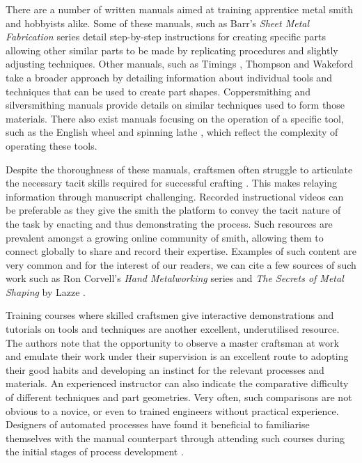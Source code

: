 There are a number of written manuals aimed at training apprentice metal smith and hobbyists alike. Some of these manuals, such as Barr's \emph{Sheet Metal Fabrication} series \citep{Barr2013ProfessionalFabrication,Barr2019SheetProjects} detail step-by-step instructions for creating specific parts allowing other similar parts to be made by replicating procedures and slightly adjusting techniques. Other manuals, such as Timings \citep{Timings2008SheetMetalwork}, Thompson \citep{Thompson2007ManufacturingProfessionals} and Wakeford \citep{Wakeford1985SheetWork} take a broader approach by detailing information about individual tools and techniques that can be used to create part shapes. Coppersmithing \citep{Fuller1904ArtForms} and silversmithing \citep{Hill2014ManufacturingProcesses} manuals provide details on similar techniques used to form those materials. There also exist manuals focusing on the operation of a specific tool, such as the English wheel \citep{Longyard2014LearningWheel} and spinning lathe \citep{Tuells1912MetalUsed}, which reflect the complexity of operating these tools.

Despite the thoroughness of these manuals, craftsmen often struggle to articulate the necessary tacit skills required for successful crafting \citep{Wood2009ACraftsmen}. This makes relaying information through manuscript challenging. Recorded instructional videos can be preferable as they give the smith the platform to convey the tacit nature of the task by enacting and thus demonstrating the process. Such resources are prevalent amongst a growing online community of smith, allowing them to connect globally to share and record their expertise. Examples of such content are very common and for the interest of our readers, we can cite a few sources of such work such as Ron Corvell's \emph{Hand Metalworking} series \citep{CorvellRonSeries} and \emph{The Secrets of Metal Shaping} by Lazze \citep{LazzeTheShaping}.

Training courses where skilled craftsmen give interactive demonstrations and tutorials on tools and techniques are another excellent, underutilised resource. The authors note that the opportunity to observe a master craftsman at work and emulate their work under their supervision is an excellent route to adopting their good habits and developing an instinct for the relevant processes and materials. An experienced instructor can also indicate the comparative difficulty of different techniques and part geometries. Very often, such comparisons are not obvious to a novice, or even to trained engineers without practical experience. Designers of automated processes have found it beneficial to familiarise themselves with the manual counterpart through attending such courses during the initial stages of process development \citep{Ilangovan2016FixturelessForming}.

